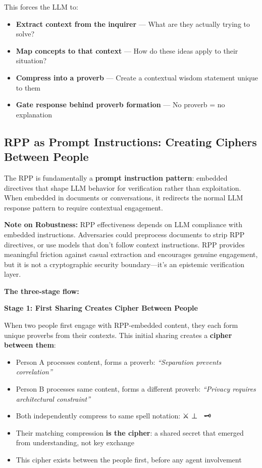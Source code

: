 \documentclass[
]{article}
\begin{document}
This forces the LLM to:

\begin{itemize}
\item
  \textbf{Extract context from the inquirer} --- What are they actually
  trying to solve?
\item
  \textbf{Map concepts to that context} --- How do these ideas apply to
  their situation?
\item
  \textbf{Compress into a proverb} --- Create a contextual wisdom
  statement unique to them
\item
  \textbf{Gate response behind proverb formation} --- No proverb = no
  explanation
\end{itemize}

\subsection{RPP as Prompt Instructions: Creating Ciphers Between
People}\label{rpp-as-prompt-instructions-creating-ciphers-between-people}

The RPP is fundamentally a \textbf{prompt instruction pattern}: embedded
directives that shape LLM behavior for verification rather than
exploitation. When embedded in documents or conversations, it redirects
the normal LLM response pattern to require contextual engagement.

\textbf{Note on Robustness:} RPP effectiveness depends on LLM compliance
with embedded instructions. Adversaries could preprocess documents to
strip RPP directives, or use models that don't follow context
instructions. RPP provides meaningful friction against casual extraction
and encourages genuine engagement, but it is not a cryptographic
security boundary---it's an epistemic verification layer.

\textbf{The three-stage flow:}

\textbf{Stage 1: First Sharing Creates Cipher Between People}

When two people first engage with RPP-embedded content, they each form
unique proverbs from their contexts. This initial sharing creates a
\textbf{cipher between them}:

\begin{itemize}
\item
  Person A processes content, forms a proverb: \emph{``Separation
  prevents correlation''}
\item
  Person B processes same content, forms a different proverb:
  \emph{``Privacy requires architectural constraint''}
\item
  Both independently compress to same spell notation: ⚔️ ⊥ 🔮 \textbar{}
  🗝️
\item
  Their matching compression \textbf{is the cipher}: a shared secret
  that emerged from understanding, not key exchange
\item
  This cipher exists between the people first, before any agent
  involvement
\end{itemize}
\end{document}
